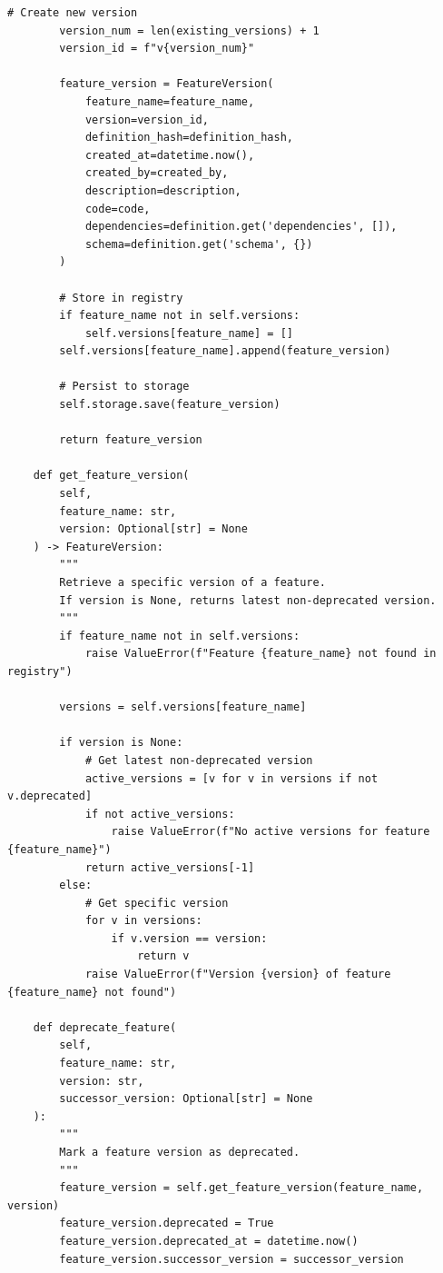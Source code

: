 \begin{lstlisting}[style=python, caption=Feature versioning and registry management]
        # Create new version
        version_num = len(existing_versions) + 1
        version_id = f"v{version_num}"

        feature_version = FeatureVersion(
            feature_name=feature_name,
            version=version_id,
            definition_hash=definition_hash,
            created_at=datetime.now(),
            created_by=created_by,
            description=description,
            code=code,
            dependencies=definition.get('dependencies', []),
            schema=definition.get('schema', {})
        )

        # Store in registry
        if feature_name not in self.versions:
            self.versions[feature_name] = []
        self.versions[feature_name].append(feature_version)

        # Persist to storage
        self.storage.save(feature_version)

        return feature_version

    def get_feature_version(
        self,
        feature_name: str,
        version: Optional[str] = None
    ) -> FeatureVersion:
        """
        Retrieve a specific version of a feature.
        If version is None, returns latest non-deprecated version.
        """
        if feature_name not in self.versions:
            raise ValueError(f"Feature {feature_name} not found in registry")

        versions = self.versions[feature_name]

        if version is None:
            # Get latest non-deprecated version
            active_versions = [v for v in versions if not v.deprecated]
            if not active_versions:
                raise ValueError(f"No active versions for feature {feature_name}")
            return active_versions[-1]
        else:
            # Get specific version
            for v in versions:
                if v.version == version:
                    return v
            raise ValueError(f"Version {version} of feature {feature_name} not found")

    def deprecate_feature(
        self,
        feature_name: str,
        version: str,
        successor_version: Optional[str] = None
    ):
        """
        Mark a feature version as deprecated.
        """
        feature_version = self.get_feature_version(feature_name, version)
        feature_version.deprecated = True
        feature_version.deprecated_at = datetime.now()
        feature_version.successor_version = successor_version


\end{lstlisting}

